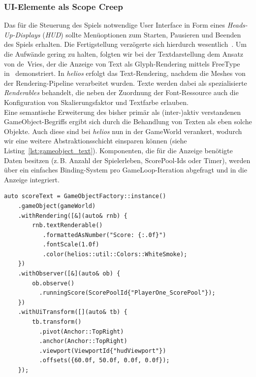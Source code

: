 \subsubsection{UI-Elemente als Scope Creep}
Das für die Steuerung des Spiels notwendige User Interface in Form eines \textit{Heads-Up-Displays} (\textit{HUD}) sollte Menüoptionen zum Starten, Pausieren und Beenden des Spiels erhalten.
Die Fertigstellung verzögerte sich hierdurch wesentlich~\cite[S. 274]{Mou15}.
Um die Aufwände gering zu halten, folgten wir bei der Textdarstellung dem Ansatz von de~Vries, der die Anzeige von Text als Glyph-Rendering mittels FreeType~\cite{freetype} in~\cite[S. 449-457]{Vri20} demonstriert.
In \textit{helios} erfolgt das Text-Rendering, nachdem die Meshes von der Rendering-Pipeline verarbeitet wurden.
Texte werden dabei als spezialisierte \textit{Renderables} behandelt, die neben der Zuordnung der Font-Ressource auch die Konfiguration von Skalierungsfaktor und Textfarbe erlauben.\\

Eine semantische Erweiterung des bisher primär als (inter-)aktiv verstandenen GameObject-Begriffs ergibt sich durch die Behandlung von Texten als eben solche Objekte.
Auch diese sind bei \textit{helios} nun in der GameWorld verankert, wodurch wir eine weitere Abstraktionsschicht einsparen können (siehe Listing~\ref{lst:gameobject_text}).
Komponenten, die für die Anzeige benötigte Daten besitzen (z.\,B. Anzahl der Spielerleben, ScorePool-Ids oder Timer), werden über ein einfaches Binding-System pro GameLoop-Iteration abgefragt und in die Anzeige integriert.

\vspace{5mm}
\begin{lstlisting}[style=c++style,
    caption={Implementierung eines einfachen Score-Textes, der die Punktzahl des Spielers anzeigt. UI-Elemente werden analog zu aktiven, mit der Spielwelt verbundenen Objekten modelliert und entsprechend konfiguriert.},
    label=lst:gameobject_text]
auto scoreText = GameObjectFactory::instance()
    .gameObject(gameWorld)
    .withRendering([&](auto& rnb) {
        rnb.textRenderable()
           .formattedAsNumber("Score: {:.0f}")
           .fontScale(1.0f)
           .color(helios::util::Colors::WhiteSmoke);
    })
    .withObserver([&](auto& ob) {
        ob.observe()
          .runningScore(ScorePoolId{"PlayerOne_ScorePool"});
    })
    .withUiTransform([](auto& tb) {
        tb.transform()
          .pivot(Anchor::TopRight)
          .anchor(Anchor::TopRight)
          .viewport(ViewportId{"hudViewport"})
          .offsets({60.0f, 50.0f, 0.0f, 0.0f});
    });
\end{lstlisting}
\vspace{5mm}

